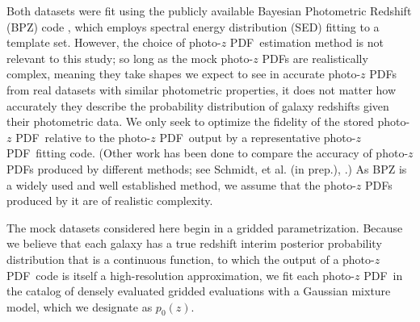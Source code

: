 \documentclass[\docopts]{\docclass}
\newcommand{\pz}{photo-$z$ PDF}
\begin{document}
Both datasets were fit using the publicly available Bayesian Photometric 
Redshift (BPZ) code \citep{benitez_bayesian_2000}, which employs spectral 
energy distribution (SED) fitting to a template set.  However, the choice of 
\pz\ estimation method is not relevant to this study; so long as the mock \pz s 
are realistically complex, meaning they take shapes we expect to see in 
accurate \pz s from real datasets with similar photometric properties, it does 
not matter how accurately they describe the probability distribution of galaxy 
redshifts given their photometric data.  We only seek to optimize the fidelity 
of the stored \pz\ relative to the \pz\ output by a representative \pz\ fitting 
code.  (Other work has been done to compare the accuracy of \pz s produced by 
different methods; see Schmidt, et al. (in prep.), 
\citet{tanaka_photometric_2017}.)  As BPZ is a widely used and well established 
method, we assume that the \pz s produced by it are of realistic complexity.

The mock datasets considered here begin in a gridded parametrization.  Because 
we believe that each galaxy has a true redshift interim posterior probability 
distribution that is a continuous function, to which the output of a \pz\ code 
is itself a high-resolution approximation, we fit each \pz\ in the catalog of 
densely evaluated gridded evaluations with a Gaussian mixture model, which we 
designate as $p_{0}(z)$.
\end{document}
